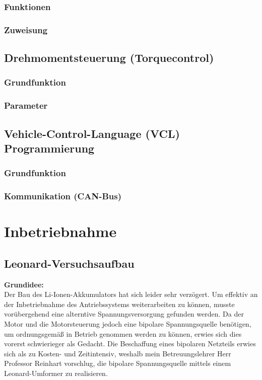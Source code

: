 \subsubsection{Funktionen}
\subsubsection{Zuweisung}


\subsection{Drehmomentsteuerung (Torquecontrol)}
\subsubsection{Grundfunktion}
\subsubsection{Parameter}


\subsection{Vehicle-Control-Language (VCL) Programmierung}
\subsubsection{Grundfunktion}
\subsubsection{Kommunikation (CAN-Bus)}

\newpage

\section{Inbetriebnahme}
\subsection{Leonard-Versuchsaufbau}
\textbf{Grundidee:}
\\[2mm]
Der Bau des Li-Ionen-Akkumulators hat sich leider sehr verzögert. Um effektiv an der Inbetriebnahme des Antriebssystems weiterarbeiten zu können, musste vorübergehend eine alterntive Spannungsversorgung gefunden werden. Da der Motor und die Motorsteuerung jedoch eine bipolare Spannungsquelle benötigen, um ordnungsgemäß in Betrieb genommen werden zu können, erwies sich dies vorerst schwierieger als Gedacht. Die Beschaffung eines bipolaren Netzteils erwies sich als zu Kosten- und Zeitintensiv, weshalb mein Betreuungslehrer Herr Professor Reinhart vorschlug, die bipolare Spannungsquelle mittels einem Leonard-Umformer zu realisieren.
\\[5mm]


